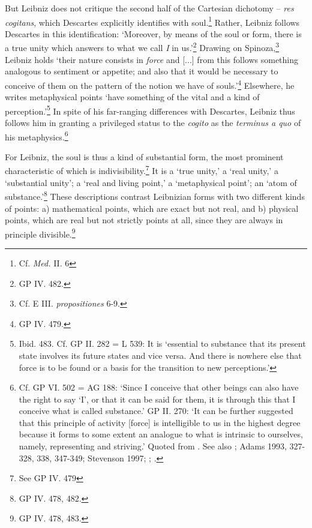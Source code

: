 \documentclass{article}
\begin{document}
But Leibniz does not critique the second half of the Cartesian dichotomy
-- \emph{res cogitans}, which Descartes explicitly identifies with
soul.\footnote{Cf. \emph{Med.} II. 6} Rather, Leibniz follows Descartes
in this identification: `Moreover, by means of the soul or form, there
is a true unity which answers to what we call \emph{I} in us.'\footnote{GP
  IV. 482.} Drawing on Spinoza,\footnote{Cf. E III. \emph{propositiones}
  6-9.} Leibniz holds `their nature consists in \emph{force} and
{[}...{]} from this follows something analogous to sentiment or
appetite; and also that it would be necessary to conceive of them on the
pattern of the notion we have of souls.'\footnote{GP IV. 479.}
Elsewhere, he writes metaphysical points `have something of the vital
and a kind of perception.'\footnote{Ibid. 483. Cf. GP II. 282 = L 539:
  It is `essential to substance that its present state involves its
  future states and vice versa. And there is nowhere else that force is
  to be found or a basis for the transition to new perceptions.'} In
spite of his far-ranging differences with Descartes, Leibniz thus
follows him in granting a privileged status to the \emph{cogito} as the
\emph{terminus a quo} of his metaphysics.\footnote{Cf. GP VI. 502 = AG
  188: `Since I conceive that other beings can also have the right to
  say `I', or that it can be said for them, it is through this that I
  conceive what is called substance.' GP II. 270: `It can be further
  suggested that this principle of activity {[}force{]} is intelligible
  to us in the highest degree because it forms to some extent an
  analogue to what is intrinsic to ourselves, namely, representing and
  striving.' Quoted from \autocite[1177]{Lodge2015}. See also \autocite[329-331]{Huffman1993}; Adams 1993, 327-328, 338, 347-349; Stevenson 1997; \autocite[63-81]{Heidegger1998}; \autocite{Lodge2015}.}

For Leibniz, the soul is thus a kind of substantial form, the most
prominent characteristic of which is indivisibility.\footnote{See GP IV.
  479} It is a `true unity,' a `real unity,' a `substantial unity'; a
`real and living point,' a `metaphysical point'; an `atom of
substance.'\footnote{GP IV. 478, 482.} These descriptions contrast
Leibnizian forms with two different kinds of points: a) mathematical
points, which are exact but not real, and b) physical points, which are
real but not strictly points at all, since they are always in principle
divisible.\footnote{GP IV. 478, 483.}
\end{document}
